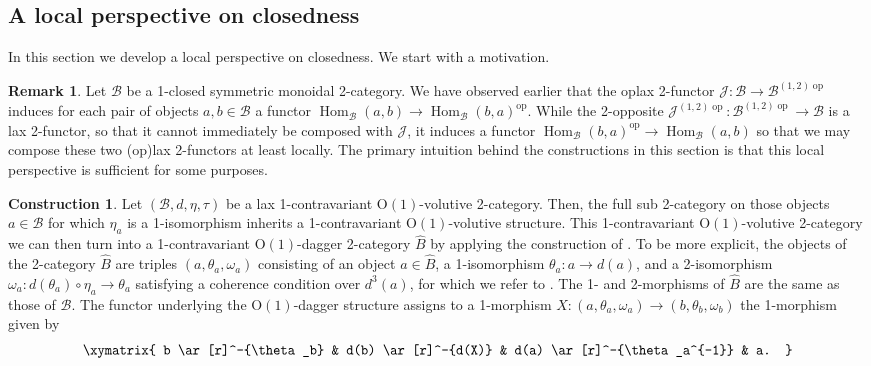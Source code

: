\documentclass{article}
\newcommand{\opp}{\operatorname{op}}%
\newcommand{\Hom}{\operatorname{Hom}}%
\newcommand{\Oone}{\operatorname{O(1)}}
\newcommand{\B}{\mathcal{B}}
\numberwithin{equation}{section}
\theoremstyle{definition}
\newtheorem{construction}[definition]{Construction}
\newtheorem{remark}[definition]{Remark}
\theoremstyle{theorem}
\begin{document}
\subsection{A local perspective on closedness}\label{Subsection: local perspective on closedness}
In this section we develop a local perspective on closedness. We start with a motivation.
\begin{remark}
    Let $\B$ be a 1-closed symmetric monoidal 2-category. We have observed earlier that the oplax 2-functor $\mathcal{J} \colon \B \to \B^{(1,2)\opp}$ 
    induces for each pair of objects $a,b \in \B$ a functor $\Hom_{\B}(a,b) \to \Hom_{\B}(b,a)^{\opp}$. While the 2-opposite 
    $\mathcal{J}^{(1,2)\opp} \colon \B^{(1,2)\opp} \to \B$ is a lax 2-functor, so that it cannot immediately be composed with $\mathcal{J}$, it induces 
    a functor $\Hom_{\B}(b,a)^{\opp} \to \Hom_{\B}(a,b)$ so that we may compose these two (op)lax 2-functors at least locally. The primary intuition 
    behind the constructions in this section is that this local perspective is sufficient for some purposes.
\end{remark}
\begin{construction}\label{Construction: Oone volutive to Oone dagger}
    Let $(\B,d,\eta,\tau)$ be a lax 1-contravariant $\Oone$-volutive 2-category. Then, the full sub 2-category on those objects $a \in \B$ for which $\eta_a$ is 
    a 1-isomorphism inherits a 1-contravariant $\Oone$-volutive structure. This 1-contravariant $\Oone$-volutive 2-category we can then turn into a 
    1-contravariant $\Oone$-dagger 2-category $\hat{B}$ by applying the construction of \cite[Section 2.3.3]{carqueville2025orbifoldshigherdaggerstructures}. 
    To be more explicit, the objects of the 2-category $\hat{B}$ are triples $(a,\theta_a,\omega_a)$ consisting of an object $a \in \hat{B}$, a 1-isomorphism 
    $\theta_a \colon a \to d(a)$, and a 2-isomorphism $\omega_a \colon d(\theta_a) \circ \eta_a \to \theta_a$ satisfying a coherence condition over $d^3(a)$, for 
    which we refer to \cite[Section 2.3.3]{carqueville2025orbifoldshigherdaggerstructures}. The 1- and 2-morphisms of $\hat{B}$ are the same as those of $\B$.
    The functor underlying the $\Oone$-dagger structure assigns to a 1-morphism $X \colon (a,\theta_a,\omega_a) \to (b,\theta_b,\omega_b)$ the 1-morphism 
    given by
    \begin{equation}
        \xymatrix{
            b \ar[r]^-{\theta_b} & d(b) \ar[r]^-{d(X)} & d(a) \ar[r]^-{\theta_a^{-1}} & a.
        }
    \end{equation}
\end{construction}
\end{document}
